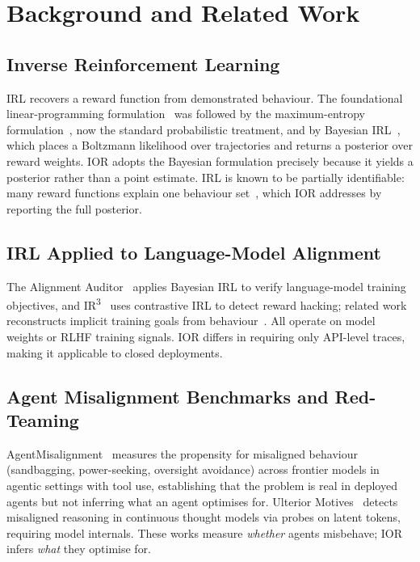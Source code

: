 \section{Background and Related Work}
\label{sec:related}

\subsection{Inverse Reinforcement Learning}
IRL recovers a reward function from demonstrated behaviour. The foundational
linear-programming formulation~\citep{ng2000algorithms} was followed by the
maximum-entropy formulation~\citep{ziebart2008maxent}, now the standard
probabilistic treatment, and by Bayesian IRL~\citep{ramachandran2007bayesian},
which places a Boltzmann likelihood over trajectories and returns a posterior over
reward weights. IOR adopts the Bayesian formulation precisely because it yields a
posterior rather than a point estimate. IRL is known to be partially identifiable:
many reward functions explain one behaviour set~\citep{partialIdentifiability2024},
which IOR addresses by reporting the full posterior.

\subsection{IRL Applied to Language-Model Alignment}
The Alignment Auditor~\citep{alignmentAuditor2025} applies Bayesian IRL to verify
language-model training objectives, and IR\textsuperscript{3}~\citep{ir3contrastive} uses
contrastive IRL to detect reward hacking; related work reconstructs implicit
training goals from behaviour~\citep{insightsInverse2024}. All operate on model
weights or RLHF training signals. IOR differs in requiring only API-level traces,
making it applicable to closed deployments.

\subsection{Agent Misalignment Benchmarks and Red-Teaming}
AgentMisalignment~\citep{agentMisalignment2025} measures the propensity for
misaligned behaviour (sandbagging, power-seeking, oversight avoidance) across
frontier models in agentic settings with tool use, establishing that the problem is
real in deployed agents but not inferring what an agent optimises for. Ulterior
Motives~\citep{ulteriorMotives2026} detects misaligned reasoning in continuous
thought models via probes on latent tokens, requiring model internals. These works
measure \emph{whether} agents misbehave; IOR infers \emph{what} they optimise for.

